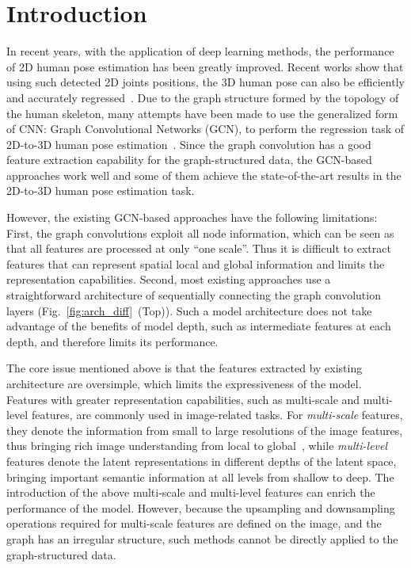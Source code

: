 \documentclass[final]{cvpr}
\begin{document}
\section{Introduction}

In recent years, with the application of deep learning methods, the performance of 2D human pose estimation has been greatly improved. Recent works show that using such detected 2D joints positions, the 3D human pose can also be efficiently and accurately regressed~\cite{Martinez2017ASY}. Due to the graph structure formed by the topology of the human skeleton, many attempts have been made to use the generalized form of CNN: Graph Convolutional Networks (GCN), to perform the regression task of 2D-to-3D human pose estimation~\cite{zhaoCVPR19semantic,wang2019gcn,Liu2020}. Since the graph convolution has a good feature extraction capability for the graph-structured data, the GCN-based approaches work well and some of them achieve the state-of-the-art results in the 2D-to-3D human pose estimation task.

However, the existing GCN-based approaches have the following limitations: 
First, the graph convolutions exploit all node information, which can be seen as that all features are processed at only ``one scale''.
Thus it is difficult to extract features that can represent spatial local and global information and limits the representation capabilities. 
Second, most existing approaches use a straightforward architecture of sequentially connecting the graph convolution layers (Fig.~\ref{fig:arch_diff}~(Top)). Such a model architecture does not take advantage of the benefits of model depth, 
such as intermediate features at each depth, and therefore limits its performance.

The core issue mentioned above is that the features extracted by existing architecture are oversimple, which limits the expressiveness of the model. 
Features with greater representation capabilities, such as multi-scale and multi-level features, are commonly used in image-related tasks.
For \textit{multi-scale} features, they denote the information from small to large resolutions of the image features, thus bringing rich image understanding from local to global~\cite{ms-cnn, FPN2017}, 
while \textit{multi-level} features denote the latent representations in different depths of the latent space, bringing important semantic information at all levels from shallow to deep.
The introduction of the above multi-scale and multi-level features can enrich the performance of the model. However, because the upsampling and downsampling operations required for multi-scale features are defined on the image, 
and the graph has an irregular structure, such methods cannot be directly applied to the graph-structured data. 
\end{document}

